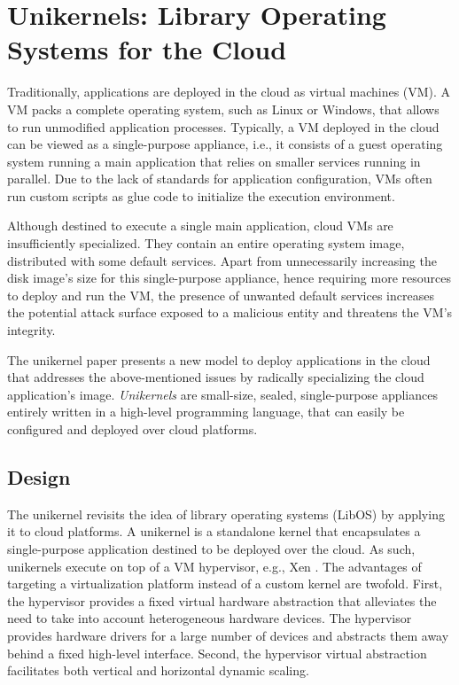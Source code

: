 \section{Unikernels: Library Operating Systems for the Cloud}
Traditionally, applications are deployed in the cloud as virtual machines (VM).
A VM packs a complete operating system, such as Linux or Windows, that allows to run unmodified application processes.
Typically, a VM deployed in the cloud can be viewed as a single-purpose appliance, i.e., it consists of a guest operating system running a main application that relies on smaller services running in parallel.
Due to the lack of standards for application configuration, VMs often run custom scripts as glue code to initialize the execution environment.

Although destined to execute a single main application, cloud VMs are insufficiently specialized.
They contain an entire operating system image, distributed with some default services.
Apart from unnecessarily increasing the disk image's size for this single-purpose appliance, hence requiring more resources to deploy and run the VM, the presence of unwanted default services increases the potential attack surface exposed to a malicious entity and threatens the VM's integrity.

The unikernel paper \cite{DBLP:conf/asplos/MadhavapeddyMRSSGSHC13} presents a new model to deploy applications in the cloud that addresses the above-mentioned issues by radically specializing the cloud application's image.
\emph{Unikernels} are small-size, sealed, single-purpose appliances entirely written in a high-level programming language, that can easily be configured and deployed over cloud platforms.

\subsection{Design}
The unikernel revisits the idea of library operating systems (LibOS) by applying it to cloud platforms.
A unikernel is a standalone kernel that encapsulates a single-purpose application destined to be deployed over the cloud.
As such, unikernels execute on top of a VM hypervisor, e.g., Xen \cite{DBLP:conf/sosp/BarhamDFHHHN03}.
The advantages of targeting a virtualization platform instead of a custom kernel are twofold.
First, the hypervisor provides a fixed virtual hardware abstraction that alleviates the need to take into account heterogeneous hardware devices.
The hypervisor provides hardware drivers for a large number of devices and abstracts them away behind a fixed high-level interface.
Second, the hypervisor virtual abstraction facilitates both vertical and horizontal dynamic scaling.

